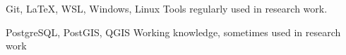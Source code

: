 
\begin{cvskills}

  \cvskill
    {\faCircle \faCircle \faCircle \faCircle \faCircleThin} %
    {Git, \LaTeX, WSL, Windows, Linux} %
    {Tools regularly used in research work.} %

  \cvskill
    {\faCircle \faCircle \faCircle \faCircleThin \faCircleThin} %
    {PostgreSQL, PostGIS, QGIS} %
    {Working knowledge, sometimes used in research work} %

\end{cvskills}